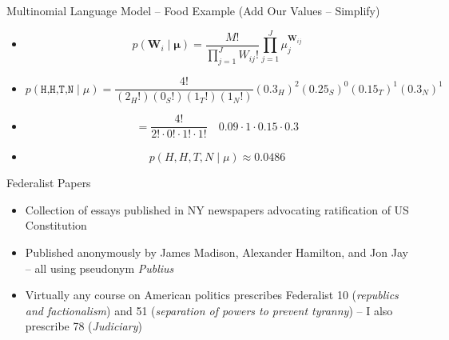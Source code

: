 \documentclass[
  ignorenonframetext,
  aspectratio=169]{beamer}
\begin{document}
\begin{frame}{Multinomial Language Model -- Food Example (Add Our Values
-- Simplify)}
\label{multinomial-language-model-food-example-add-our-values-simplify}
\begin{itemize}
\item[]$$
p(\mathbf{W}_i \mid \boldsymbol{\mu}) = 
\frac{M!}{\prod_{j=1}^J W_{ij}!} \prod_{j=1}^J
\mu_{j}^{\mathbf{W}_{ij}}
$$ 
\par \vspace{5mm} \pause
\item[] $$
p(\texttt{H,H,T,N} \mid \mu) = 
\frac{4!}{(2_{H}!)(0_{S}!)(1_{T}!)(1_{N}!)}
(0.3_H)^2 (0.25_S)^0 (0.15_T)^1 (0.3_N)^1
$$ \par \vspace{5mm} \pause
\item[] $$ = \frac{4!}{2!\cdot0!\cdot1!\cdot1!}\quad 0.09 \cdot 1 \cdot 0.15 \cdot 0.3$$ \par \vspace{5mm} \pause
\item[] $$ p(H,H,T,N \mid \mu) \approx 0.0486 $$
\end{itemize}
\end{frame}

\begin{frame}{Federalist Papers}
\label{federalist-papers}
\begin{itemize}
\item Collection of essays published in NY newspapers advocating ratification of US Constitution \par \vspace{2.5mm}
\item Published anonymously by James Madison, Alexander Hamilton, and Jon Jay -- all using pseudonym \textit{Publius} \par \vspace{2.5mm}
\item Virtually any course on American politics prescribes Federalist 10  (\textit{republics and factionalism}) and 51 (\textit{separation of powers to prevent tyranny})  -- I also prescribe 78 (\textit{Judiciary})
\end{itemize}
\end{frame}
\end{document}
